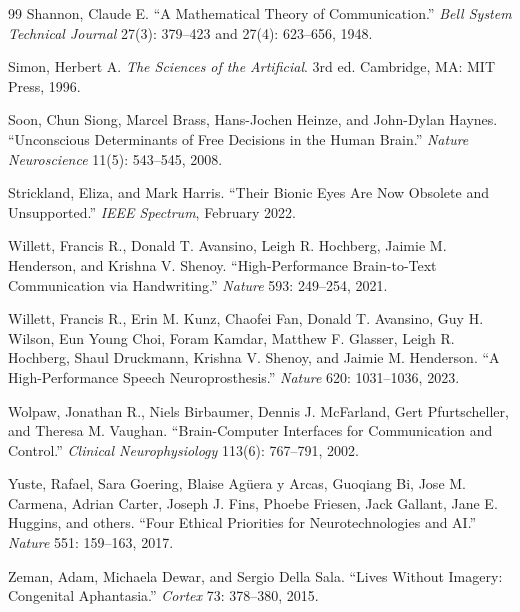 \documentclass[11pt,twoside,openany]{book}
\theoremstyle{definition}
\theoremstyle{remark}
\begin{document}
\begin{thebibliography}{99}
 Shannon, Claude E. ``A Mathematical Theory of Communication.'' \textit{Bell System Technical Journal} 27(3): 379--423 and 27(4): 623--656, 1948.

 Simon, Herbert A. \textit{The Sciences of the Artificial}. 3rd ed. Cambridge, MA: MIT Press, 1996.

 Soon, Chun Siong, Marcel Brass, Hans-Jochen Heinze, and John-Dylan Haynes. ``Unconscious Determinants of Free Decisions in the Human Brain.'' \textit{Nature Neuroscience} 11(5): 543--545, 2008.

 Strickland, Eliza, and Mark Harris. ``Their Bionic Eyes Are Now Obsolete and Unsupported.'' \textit{IEEE Spectrum}, February 2022.

 Willett, Francis R., Donald T. Avansino, Leigh R. Hochberg, Jaimie M. Henderson, and Krishna V. Shenoy. ``High-Performance Brain-to-Text Communication via Handwriting.'' \textit{Nature} 593: 249--254, 2021.

 Willett, Francis R., Erin M. Kunz, Chaofei Fan, Donald T. Avansino, Guy H. Wilson, Eun Young Choi, Foram Kamdar, Matthew F. Glasser, Leigh R. Hochberg, Shaul Druckmann, Krishna V. Shenoy, and Jaimie M. Henderson. ``A High-Performance Speech Neuroprosthesis.'' \textit{Nature} 620: 1031--1036, 2023.

 Wolpaw, Jonathan R., Niels Birbaumer, Dennis J. McFarland, Gert Pfurtscheller, and Theresa M. Vaughan. ``Brain-Computer Interfaces for Communication and Control.'' \textit{Clinical Neurophysiology} 113(6): 767--791, 2002.

 Yuste, Rafael, Sara Goering, Blaise Ag\"uera y Arcas, Guoqiang Bi, Jose M. Carmena, Adrian Carter, Joseph J. Fins, Phoebe Friesen, Jack Gallant, Jane E. Huggins, and others. ``Four Ethical Priorities for Neurotechnologies and AI.'' \textit{Nature} 551: 159--163, 2017.

 Zeman, Adam, Michaela Dewar, and Sergio Della Sala. ``Lives Without Imagery: Congenital Aphantasia.'' \textit{Cortex} 73: 378--380, 2015.

\end{thebibliography}
\end{document}
